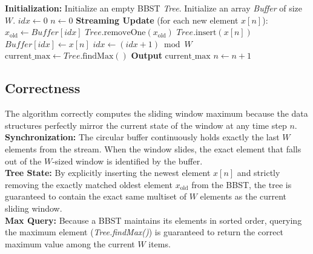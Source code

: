 \documentclass[11pt]{article}
\begin{document}
\begin{algorithm}[H]
\caption{Sliding Max with $\mathcal{O}(\log W)$ worst-case time}
\begin{algorithmic}[1]
\State \textbf{Initialization:}
\State Initialize an empty BBST \textit{Tree}.
\State Initialize an array \textit{Buffer} of size $W$.
\State $\textit{idx} \gets 0$
\State $n \gets 0$ 
\State \textbf{Streaming Update} (for each new element $x[n]$):
    \State $x_{\text{old}} \gets \textit{Buffer}[\textit{idx}]$
    \State $\textit{Tree}.\text{removeOne}(x_{\text{old}})$ 
\EndIf
\State $\textit{Tree}.\text{insert}(x[n])$ 
\State $\textit{Buffer}[\textit{idx}] \gets x[n]$ 
\State $\textit{idx} \gets (\textit{idx} + 1) \bmod W$ 
    \State $\text{current\_max} \gets \textit{Tree}.\text{findMax}()$ 
    \State \textbf{Output} $\text{current\_max}$
\EndIf
\State $n \gets n + 1$
\end{algorithmic}
\end{algorithm}

\subsection*{Correctness}

The algorithm correctly computes the sliding window maximum because the data structures perfectly mirror the current state of the window at any time step $n$.\\
\textbf{Synchronization:} The circular buffer continuously holds exactly the last $W$ elements from the stream. When the window slides, the exact element that falls out of the $W$-sized window is identified by the buffer.\\
\textbf{Tree State:} By explicitly inserting the newest element $x[n]$ and strictly removing the exactly matched oldest element $x_{\text{old}}$ from the BBST, the tree is guaranteed to contain the exact same multiset of $W$ elements as the current sliding window.\\
\textbf{Max Query:} Because a BBST maintains its elements in sorted order, querying the maximum element (\textit{Tree.findMax()}) is guaranteed to return the correct maximum value among the current $W$ items.\\
\end{document}

